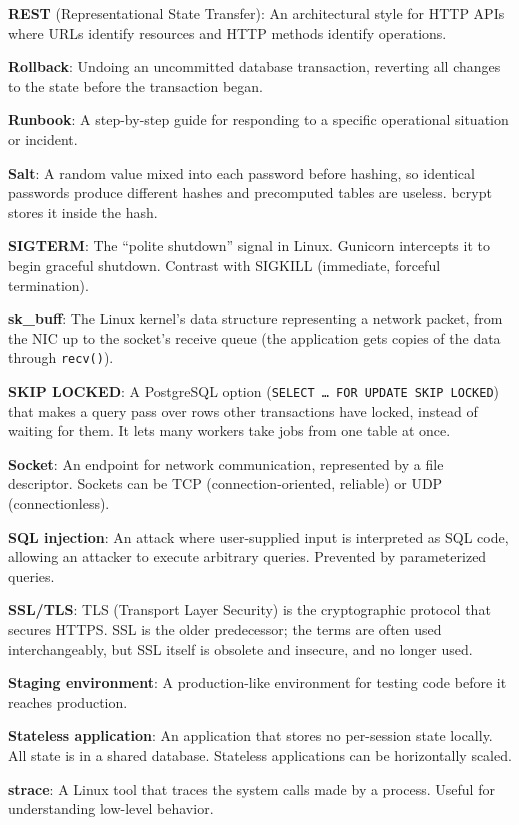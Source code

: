 \textbf{REST} (Representational State Transfer): An architectural style for HTTP APIs where URLs identify resources and HTTP methods identify operations.

\textbf{Rollback}: Undoing an uncommitted database transaction, reverting all changes to the state before the transaction began.

\textbf{Runbook}: A step-by-step guide for responding to a specific operational situation or incident.

\textbf{Salt}: A random value mixed into each password before hashing, so identical passwords produce different hashes and precomputed tables are useless. bcrypt stores it inside the hash.

\textbf{SIGTERM}: The ``polite shutdown'' signal in Linux. Gunicorn intercepts it to begin graceful shutdown. Contrast with SIGKILL (immediate, forceful termination).

\textbf{sk\_buff}: The Linux kernel's data structure representing a network packet, from the NIC up to the socket's receive queue (the application gets copies of the data through \texttt{recv()}).

\textbf{SKIP LOCKED}: A PostgreSQL option (\texttt{SELECT\ …\ FOR\ UPDATE\ SKIP\ LOCKED}) that makes a query pass over rows other transactions have locked, instead of waiting for them. It lets many workers take jobs from one table at once.

\textbf{Socket}: An endpoint for network communication, represented by a file descriptor. Sockets can be TCP (connection-oriented, reliable) or UDP (connectionless).

\textbf{SQL injection}: An attack where user-supplied input is interpreted as SQL code, allowing an attacker to execute arbitrary queries. Prevented by parameterized queries.

\textbf{SSL/TLS}: TLS (Transport Layer Security) is the cryptographic protocol that secures HTTPS. SSL is the older predecessor; the terms are often used interchangeably, but SSL itself is obsolete and insecure, and no longer used.

\textbf{Staging environment}: A production-like environment for testing code before it reaches production.

\textbf{Stateless application}: An application that stores no per-session state locally. All state is in a shared database. Stateless applications can be horizontally scaled.

\textbf{strace}: A Linux tool that traces the system calls made by a process. Useful for understanding low-level behavior.

